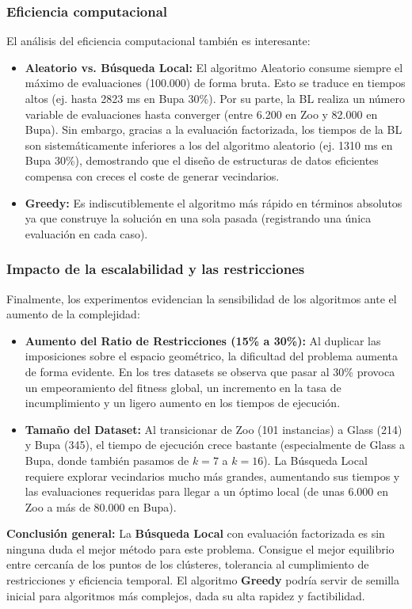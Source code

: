 \documentclass[12pt]{article}
\begin{document}
    \subsubsection{Eficiencia computacional}
    El análisis del eficiencia computacional también es interesante:
    
    \begin{itemize}
        \item \textbf{Aleatorio vs. Búsqueda Local:} El algoritmo Aleatorio consume siempre el máximo de evaluaciones (100.000) de forma bruta. Esto se traduce en tiempos altos (ej. hasta 2823 ms en Bupa 30\%). Por su parte, la BL realiza un número variable de evaluaciones hasta converger (entre 6.200 en Zoo y 82.000 en Bupa). Sin embargo, gracias a la evaluación factorizada, los tiempos de la BL son sistemáticamente inferiores a los del algoritmo aleatorio (ej. 1310 ms en Bupa 30\%), demostrando que el diseño de estructuras de datos eficientes compensa con creces el coste de generar vecindarios.
        \item \textbf{Greedy:} Es indiscutiblemente el algoritmo más rápido en términos absolutos ya que construye la solución en una sola pasada (registrando una única evaluación en cada caso).
    \end{itemize}

    \subsubsection{Impacto de la escalabilidad y las restricciones}
    Finalmente, los experimentos evidencian la sensibilidad de los algoritmos ante el aumento de la complejidad:
    
    \begin{itemize}
        \item \textbf{Aumento del Ratio de Restricciones (15\% a 30\%):} Al duplicar las imposiciones sobre el espacio geométrico, la dificultad del problema aumenta de forma evidente. En los tres datasets se observa que pasar al 30\% provoca un empeoramiento del fitness global, un incremento en la tasa de incumplimiento y un ligero aumento en los tiempos de ejecución.
        \item \textbf{Tamaño del Dataset:} Al transicionar de Zoo (101 instancias) a Glass (214) y Bupa (345), el tiempo de ejecución crece bastante (especialmente de Glass a Bupa, donde también pasamos de $k=7$ a $k=16$). La Búsqueda Local requiere explorar vecindarios mucho más grandes, aumentando sus tiempos y las evaluaciones requeridas para llegar a un óptimo local (de unas 6.000 en Zoo a más de 80.000 en Bupa).
    \end{itemize}

    \textbf{Conclusión general:} La \textbf{Búsqueda Local} con evaluación factorizada es sin ninguna duda el mejor método para este problema. Consigue el mejor equilibrio entre cercanía de los puntos de los clústeres, tolerancia al cumplimiento de restricciones y eficiencia temporal. El algoritmo \textbf{Greedy} podría servir de semilla inicial para algoritmos más complejos, dada su alta rapidez y factibilidad.
\end{document}
